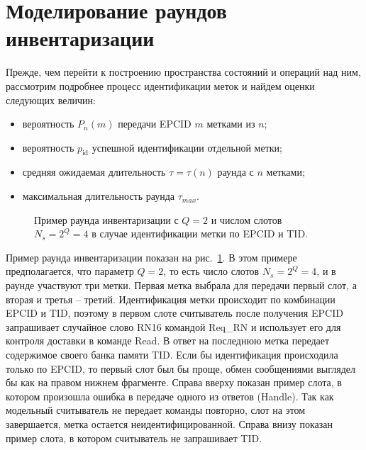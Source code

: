 \section{Моделирование раундов инвентаризации}\label{sec:ch3_inventory}
Прежде, чем перейти к построению пространства состояний и операций над ним, рассмотрим подробнее процесс идентификации меток и найдем оценки следующих величин:

\begin{itemize}
	\item вероятность $P_n(m)$ передачи EPCID $m$ метками из $n$;
	\item вероятность $p_\text{id}$ успешной идентификации отдельной метки;
	\item средняя ожидаемая длительность $\tau = \tau(n)$ раунда с $n$ метками;
	\item максимальная длительность раунда $\tau_{max}$.
\end{itemize}

\begin{figure}[htb]
  \caption[Пример раунда опроса при идентификации по EPCID и TID.]{Пример раунда инвентаризации с $Q=2$ и числом слотов $N_s=2^Q=4$ в случае идентификации метки по EPCID и TID. }
  \label{fig:ch3_inventory_round}
\end{figure}

Пример раунда инвентаризации показан на рис.~\ref{fig:ch3_inventory_round}. В этом примере предполагается, что параметр $Q = 2$, то есть число слотов $N_s = 2^Q = 4$, и в раунде участвуют три метки. Первая метка выбрала для передачи первый слот, а вторая и третья -- третий. Идентификация метки происходит по комбинации EPCID и TID, поэтому в первом слоте считыватель после получения EPCID запрашивает случайное слово RN16 командой Req\_RN и использует его для контроля доставки в команде Read. В ответ на последнюю метка передает содержимое своего банка памяти TID. Если бы идентификация происходила только по EPCID, то первый слот был бы проще, обмен сообщениями выглядел бы как на правом нижнем фрагменте. Справа вверху показан пример слота, в котором произошла ошибка в передаче одного из ответов (Handle). Так как модельный считыватель не передает команды повторно, слот на этом завершается, метка остается неидентифицированной. Справа внизу показан пример слота, в котором считыватель не запрашивает TID.

